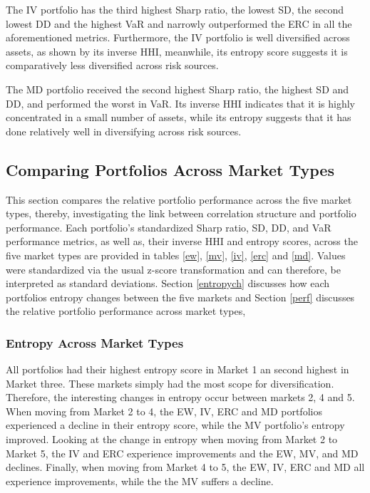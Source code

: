 \documentclass[11pt,preprint, authoryear]{elsarticle}
\numberwithin{equation}{section}
\numberwithin{figure}{section}
\numberwithin{table}{section}
\begin{document}
The IV portfolio has the third highest Sharp ratio, the lowest SD, the
second lowest DD and the highest VaR and narrowly outperformed the ERC
in all the aforementioned metrics. Furthermore, the IV portfolio is well
diversified across assets, as shown by its inverse HHI, meanwhile, its
entropy score suggests it is comparatively less diversified across risk
sources.

The MD portfolio received the second highest Sharp ratio, the highest SD
and DD, and performed the worst in VaR. Its inverse HHI indicates that
it is highly concentrated in a small number of assets, while its entropy
suggests that it has done relatively well in diversifying across risk
sources.

\hypertarget{comparing-portfolios-across-market-types}{%
\subsection{\texorpdfstring{Comparing Portfolios Across Market Types
\label {cross-market}}{Comparing Portfolios Across Market Types }}\label{comparing-portfolios-across-market-types}}

This section compares the relative portfolio performance across the five
market types, thereby, investigating the link between correlation
structure and portfolio performance. Each portfolio's standardized Sharp
ratio, SD, DD, and VaR performance metrics, as well as, their inverse
HHI and entropy scores, across the five market types are provided in
tables \ref{ew}, \ref{mv}, \ref{iv}, \ref{erc} and \ref{md}. Values were
standardized via the usual z-score transformation and can therefore, be
interpreted as standard deviations. Section \ref{entropych} discusses
how each portfolios entropy changes between the five markets and Section
\ref{perf} discusses the relative portfolio performance across market
types,

\hypertarget{entropy-across-market-types}{%
\subsubsection{\texorpdfstring{Entropy Across Market Types
\label{entropych}}{Entropy Across Market Types }}\label{entropy-across-market-types}}

All portfolios had their highest entropy score in Market 1 an second
highest in Market three. These markets simply had the most scope for
diversification. Therefore, the interesting changes in entropy occur
between markets 2, 4 and 5. When moving from Market 2 to 4, the EW, IV,
ERC and MD portfolios experienced a decline in their entropy score,
while the MV portfolio's entropy improved. Looking at the change in
entropy when moving from Market 2 to Market 5, the IV and ERC experience
improvements and the EW, MV, and MD declines. Finally, when moving from
Market 4 to 5, the EW, IV, ERC and MD all experience improvements, while
the the MV suffers a decline.
\end{document}

